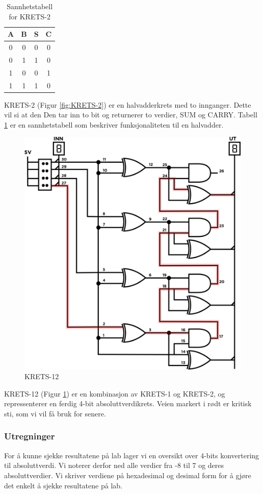 \documentclass{article}
\begin{document}
\begin{table}[h]
	\centering
	\caption{Sannhetstabell for KRETS-2}
	\label{tab:sannhet1}
	\vspace{0.2cm}
	\begin{tabular} {| c | c | c | c |} \hline
		A & B & S & C \\ \hline
		0 & 0 & 0 & 0 \\ \hline
		0 & 1 & 1 & 0 \\ \hline
		1 & 0 & 0 & 1 \\ \hline
		1 & 1 & 1 & 0 \\ \hline
	\end{tabular}
\end{table}

KRETS-2 (Figur \ref{fig:KRETS-2}) er en halvadderkrets med to innganger. Dette vil si at den Den tar inn to bit og returnerer to verdier, SUM og CARRY. Tabell \ref{tab:sannhet1} er en sannhetstabell som beskriver funksjonaliteten til en halvadder.

\begin{figure}[H]
	\centering
	\includegraphics[width=0.5\linewidth]{krets12}
	\caption{KRETS-12}
	\label{fig:KRETS-12}
\end{figure}

KRETS-12 (Figur \ref{fig:KRETS-12}) er en kombinasjon av KRETS-1 og KRETS-2, og repressenterer en ferdig 4-bit absoluttverdikrets. Veien markert i rødt er kritisk sti, som vi vil få bruk for senere.

\subsubsection{Utregninger} %
For å kunne sjekke resultatene på lab lager vi en oversikt over 4-bits konvertering til absoluttverdi. Vi noterer derfor ned alle verdier fra -8 til 7 og deres absoluttverdier. Vi skriver verdiene på hexadesimal og desimal form for å gjøre det enkelt å sjekke resultatene på lab.
\end{document}

